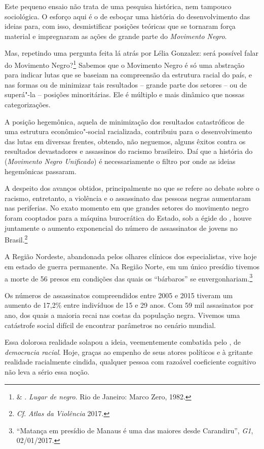 Este pequeno ensaio não trata de uma pesquisa histórica, nem tampouco
sociológica. O esforço aqui é o de esboçar uma história do
desenvolvimento das ideias para, com isso,
desmistificar posições teóricas
que se tornaram força material e impregnaram as ações de grande parte do
\emph{Movimento Negro}.

Mas, repetindo uma pergunta feita lá atrás por Lélia Gonzalez: será
possível falar do Movimento Negro?\footnote{ \& .
  \emph{Lugar de negro}. Rio de Janeiro: Marco Zero, 1982.}
Sabemos que o Movimento Negro é
só uma abstração para indicar lutas que se baseiam na compreensão da
estrutura racial do país, e nas formas ou de minimizar tais resultados
-- grande parte dos setores -- ou de superá"-la -- posições minoritárias.
Ele é múltiplo e mais dinâmico que nossas categorizações.

A posição hegemônica, aquela de minimização dos resultados catastróficos
de uma estrutura econômico"-social racializada, contribuiu para o
desenvolvimento das lutas em diversas frentes, obtendo, não neguemos,
alguns êxitos contra os resultados devastadores e assassinos do racismo
brasileiro. Daí que a história do  (\emph{Movimento Negro Unificado})
é necessariamente o filtro por onde as ideias hegemônicas passaram.

A despeito dos avanços obtidos, principalmente no que se refere ao
debate sobre o racismo, entretanto, a violência e o assassinato das
pessoas negras aumentaram nas periferias. No exato momento em que
grandes setores do movimento negro foram cooptados para a máquina
burocrática do Estado, sob a égide do , houve juntamente o aumento
exponencial do número de assassinatos de jovens no Brasil.\footnote{\emph{Cf}.
  \emph{Atlas da Violência} 2017.}

A Região Nordeste, abandonada
pelos olhares clínicos dos especialistas, vive hoje em estado de guerra
permanente. Na Região Norte, em um único presídio tivemos a morte de 56
presos em condições das quais os ``bárbaros'' se
envergonhariam.\footnote{``Matança em presídio de Manaus é uma das maiores
  desde Carandiru'', \emph{G1}, 02/01/2017.}

Os números de assassinatos compreendidos entre 2005 e 2015 tiveram um
aumento de 17,2\% entre indivíduos de 15 e 29 anos. Com 59 mil
assasinatos por ano, dos quais a maioria recai nas costas da população
negra. Vivemos uma catástrofe social difícil de encontrar parâmetros no
cenário mundial.

Essa dolorosa realidade solapou a ideia, veementemente combatida pelo
, de \emph{democracia racial}. Hoje, graças ao empenho de seus atores
políticos e à gritante realidade racialmente cindida, qualquer pessoa
com razoável coeficiente cognitivo não leva a sério essa noção.

